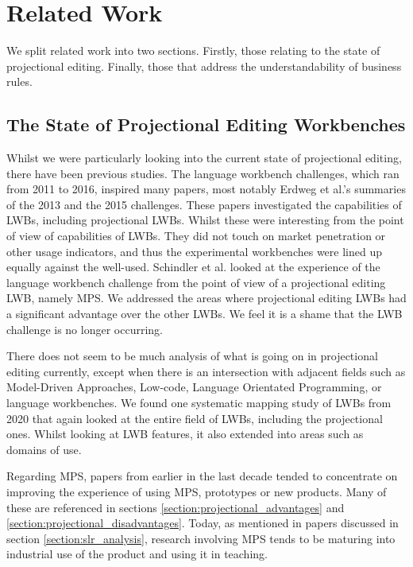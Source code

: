 \chapter{Related Work}
\label{chapter:RelatedWork}

We split related work into two sections. 
Firstly, those relating to the state of projectional editing.
Finally, those that address the understandability of business rules.

\section{The State of Projectional Editing Workbenches}

Whilst we were particularly looking into the current state of projectional editing, there have been previous studies.
The language workbench challenges, which ran from 2011 to 2016, inspired many papers, most notably Erdweg et al.'s summaries of the 2013\cite{erdweg2013state} and the 2015\cite{erdweg2015evaluating} challenges.
These papers investigated the capabilities of LWBs, including projectional LWBs.
Whilst these were interesting from the point of view of capabilities of LWBs. 
They did not touch on market penetration or other usage indicators, and thus the experimental workbenches were lined up equally against the well-used.
Schindler et al.\cite{schindler2016language} looked at the experience of the language workbench challenge from the point of view of a projectional editing LWB, namely MPS.
We addressed the areas where projectional editing LWBs had a significant advantage over the other LWBs. 
We feel it is a shame that the LWB challenge is no longer occurring.

There does not seem to be much analysis of what is going on in projectional editing currently, except when there is an intersection with adjacent fields such as Model-Driven Approaches, Low-code, Language Orientated Programming, or language workbenches.
We found one systematic mapping study of LWBs\cite{iung2020systematic} from 2020 that again looked at the entire field of LWBs, including the projectional ones.
Whilst looking at LWB features, it also extended into areas such as domains of use.

Regarding MPS, papers from earlier in the last decade tended to concentrate on improving the experience of using MPS, prototypes or new products.
Many of these are referenced in sections \ref{section:projectional_advantages} and \ref{section:projectional_disadvantages}.
Today, as mentioned in papers discussed in section \ref{section:slr_analysis}, research involving MPS tends to be maturing into industrial use of the product and using it in teaching.

